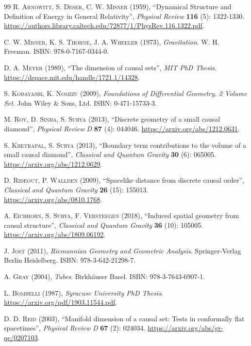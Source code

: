 \documentclass{article}
\begin{document}
\begin{thebibliography}{99}
\textsc{R. Arnowitt, S. Deser, C. W. Misner} (1959), ``Dynamical Structure and Definition of Energy in General Relativity'', \textit{Physical Review} \textbf{116} (5): 1322-1330. \url{https://authors.library.caltech.edu/72877/1/PhysRev.116.1322.pdf}.

\textsc{C. W. Misner, K. S. Thorne, J. A. Wheeler} (1973), \textit{Gravitation}. W. H. Freeman. ISBN: 978-0-7167-0344-0.

\textsc{D. A. Meyer} (1989), ``The dimension of causal sets'', \textit{MIT PhD Thesis}. \url{https://dspace.mit.edu/handle/1721.1/14328}.

\textsc{S. Kobayashi, K. Nomizu} (2009), \textit{Foundations of Differential Geometry, 2 Volume Set}. John Wiley \& Sons, Ltd. ISBN: 0-471-15733-3.

\textsc{M. Roy, D. Sinha, S. Surya} (2013), ``Discrete geometry of a small causal diamond'', \textit{Physical Review D} \textbf{87} (4): 044046. \url{https://arxiv.org/abs/1212.0631}.

\textsc{S. Khetrapal, S. Surya} (2013), ``Boundary term contributions to the volume of a small causal diamond'', \textit{Classical and Quantum Gravity} \textbf{30} (6): 065005. \url{https://arxiv.org/abs/1212.0629}.

\textsc{D. Rideout, P. Wallden} (2009), ``Spacelike distance from discrete causal order'', \textit{Classical and Quantum Gravity} \textbf{26} (15): 155013. \url{https://arxiv.org/abs/0810.1768}.

\textsc{A. Eichhorn, S. Surya, F. Versteegen} (2018), ``Induced spatial geometry from causal structure'', \textit{Classical and Quantum Gravity} \textbf{36} (10): 105005. \url{https://arxiv.org/abs/1809.06192}.

\textsc{J. Jost} (2011), \textit{Riemannian Geometry and Geometric Analysis}. Springer-Verlag Berlin Heidelberg. ISBN: 978-3-642-21298-7.

\textsc{A. Gray} (2004), \textit{Tubes}. Birkh\"auser Basel. ISBN: 978-3-7643-6907-1.

\textsc{L. Bombelli} (1987), \textit{Syracuse University PhD Thesis}. \url{https://arxiv.org/pdf/1903.11544.pdf}.

\textsc{D. D. Reid} (2003), ``Manifold dimension of a causal set: Tests in conformally flat spacetimes'', \textit{Physical Review D} \textbf{67} (2): 024034. \url{https://arxiv.org/abs/gr-qc/0207103}.


\end{thebibliography}
\end{document}
